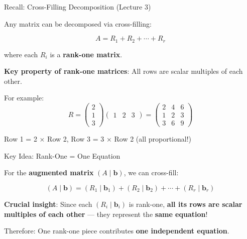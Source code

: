 \documentclass[10pt]{beamer}
\theoremstyle{definition}
\newcommand{\x}[1]{\alert{\textbf{#1}}}
\begin{document}
\begin{frame}{Recall: Cross-Filling Decomposition (Lecture 3)}

Any matrix can be decomposed via cross-filling:

$$A = R_1 + R_2 + \cdots + R_r$$

where each $R_i$ is a \x{rank-one matrix}.

\vspace{1em}

\x{Key property of rank-one matrices}: All rows are scalar multiples of each other.

\vspace{1em}

For example:
$$R = \begin{pmatrix} 2 \\ 1 \\ 3 \end{pmatrix} \begin{pmatrix} 1 & 2 & 3 \end{pmatrix} = \begin{pmatrix}
2 & 4 & 6 \\
1 & 2 & 3 \\
3 & 6 & 9
\end{pmatrix}$$

Row 1 = 2 × Row 2, Row 3 = 3 × Row 2 (all proportional!)

\end{frame}

\begin{frame}{Key Idea: Rank-One = One Equation}

For the \x{augmented matrix} $(A \mid \mathbf{b})$, we can cross-fill:

$$(A \mid \mathbf{b}) = (R_1 \mid \mathbf{b}_1) + (R_2 \mid \mathbf{b}_2) + \cdots + (R_r \mid \mathbf{b}_r)$$

\vspace{1em}

\x{Crucial insight}: Since each $(R_i \mid \mathbf{b}_i)$ is rank-one, \textbf{all its rows are scalar multiples of each other} — they represent the \x{same equation}!

\vspace{1em}

Therefore: One rank-one piece contributes \x{one independent equation}.

\end{frame}
\end{document}
